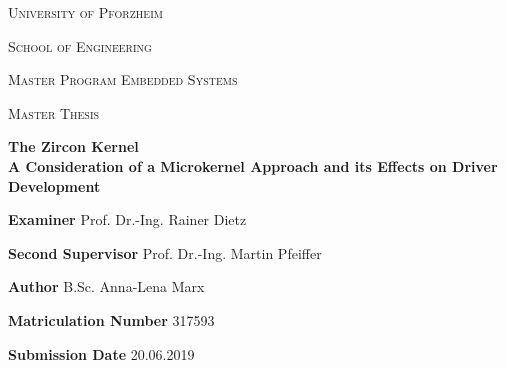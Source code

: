 \documentclass[a4paper, twoside, 12pt]{book}
\begin{document}
\frontmatter

\begin{titlepage}
{
\centering
\textsc{\LARGE University of Pforzheim} \par 
\vspace{0.3cm}
\textsc{\LARGE School of Engineering} \par 
\vspace{1.0cm}
\textsc{\Large Master Program Embedded Systems} \par 
\vspace{3.0cm}
\textsc{\Large Master Thesis} \par 
\vspace{1.0cm}
\huge\textbf{The Zircon Kernel \\ A Consideration of a Microkernel Approach and its Effects on Driver Development} \par 
\vspace{4.3cm}
\Large 
}

\textbf{Examiner} \hfill Prof. Dr.-Ing. Rainer Dietz \par %
\textbf{Second Supervisor} \hfill Prof. Dr.-Ing. Martin Pfeiffer \par %
\textbf{Author} \hfill B.Sc. Anna-Lena Marx \par 
\textbf{Matriculation Number} \hfill 317593 \par
\vspace{2.0cm}
\textbf{Submission Date} \hfill 20.06.2019


\end{titlepage}

%


\newpage




\pagestyle {headings}
\quad
\newpage

\newpage
\quad
\newpage



\tableofcontents
\newpage

\mainmatter











\newpage \appendix

%

\nocite{*}
\printbibliography


\listoflistings
\listoffigures
\listoftables
\end{document}
